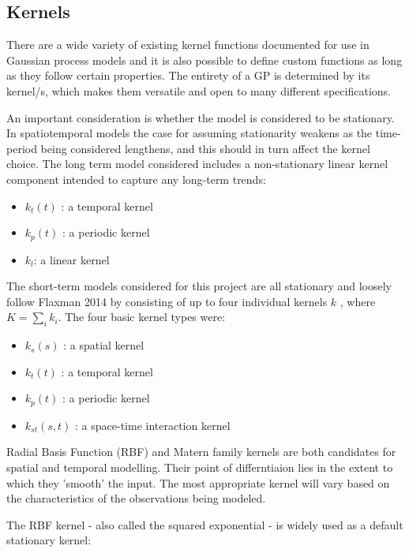\subsection{Kernels}

There are a wide variety of existing kernel functions documented for use in Gaussian process models \cite{rasmussen_2005} and it is also possible to define custom functions as long as they follow certain properties. The entirety of a GP is determined by its kernel/s, which makes them versatile and open to many different specifications. \par

An important consideration is whether the model is considered to be stationary. In spatiotemporal models the case for assuming stationarity weakens as the time-period being considered lengthens, and this should in turn affect the kernel choice. The long term model considered includes a non-stationary linear kernel component intended to capture any long-term trends:    \par

\begin{itemize}
  \item $k_t(t)$ : a temporal kernel
  \item $k_p(t)$ : a periodic kernel
  \item $k_l$: a linear kernel
\end{itemize}

The short-term models considered for this project are all stationary and loosely follow Flaxman 2014 by consisting of up to four individual kernels $k$ , where $K=\sum_{i}k_i$. The four basic kernel types were:

\begin{itemize}
  \item $k_s(s)$ : a spatial kernel
  \item $k_t(t)$ : a temporal kernel
  \item $k_p(t)$ : a periodic kernel
  \item $k_{st}(s,t)$ : a space-time interaction kernel
\end{itemize}

Radial Basis Function (RBF) and Matern family kernels are both candidates for spatial and temporal modelling. Their point of differntiaion lies in the extent to which they 'smooth' the input. The most appropriate kernel will vary based on the characteristics of the observations being modeled.

The RBF kernel - also called the squared exponential - is widely used as a default stationary kernel:

